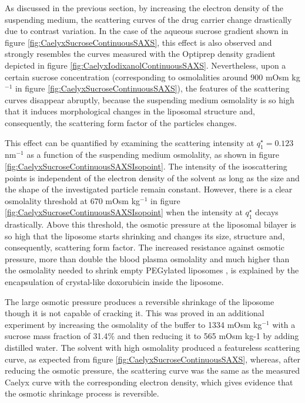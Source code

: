 As discussed in the previous section, by increasing the electron density of the suspending medium, the scattering curves of the drug carrier change drastically due to contrast variation. In the case of the aqueous sucrose gradient shown in figure \ref{fig:CaelyxSucroseContinuousSAXS}, this effect is also observed and strongly resembles the curves measured with the Optiprep density gradient depicted in figure \ref{fig:CaelyxIodixanolContinuousSAXS}. Nevertheless, upon a certain sucrose concentration (corresponding to osmolalities around 900 mOsm kg$^{-1}$ in figure \ref{fig:CaelyxSucroseContinuousSAXS}), the features of the scattering curves disappear abruptly, because the suspending medium osmolality is so high that it induces morphological changes in the liposomal structure and, consequently, the scattering form factor of the particles changes.

This effect can be quantified by examining the scattering intensity at $q^{\star}_1 = 0.123$ nm$^{-1}$ as a function of the suspending medium osmolality, as shown in figure \ref{fig:CaelyxSucroseContinuousSAXSIsopoint}. The intensity of the isoscattering points is independent of the electron density of the solvent as long as the size and the shape of the investigated particle remain constant. However, there is a clear osmolality threshold at 670 mOsm kg$^{-1}$ in figure \ref{fig:CaelyxSucroseContinuousSAXSIsopoint} when the intensity at $q^{\star}_1$ decays drastically. Above this threshold, the osmotic pressure at the liposomal bilayer is so high that the liposome starts shrinking and changes its size, structure and, consequently, scattering form factor. The increased resistance against osmotic pressure, more than double the blood plasma osmolality and much higher than the osmolality needed to shrink empty PEGylated liposomes \citep{varga_osmotic_2014}, is explained by the encapsulation of crystal-like doxorubicin inside the liposome.

The large osmotic pressure produces a reversible shrinkage of the liposome though it is not capable of cracking it. This was proved in an additional experiment by increasing the osmolality of the buffer to 1334 mOsm kg$^{-1}$ with a sucrose mass fraction of 31.4$\%$ and then reducing it to 565 mOsm kg-1 by adding distilled water. The solvent with high osmolality produced a featureless scattering curve, as expected from figure \ref{fig:CaelyxSucroseContinuousSAXS}, whereas, after reducing the osmotic pressure, the scattering curve was the same as the measured Caelyx curve with the corresponding electron density, which gives evidence that the osmotic shrinkage process is reversible.

